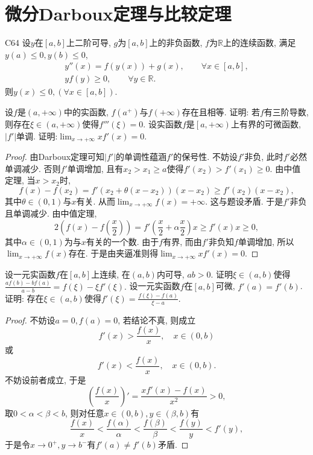 \section{微分Darboux定理与比较定理}
\begin{theorem}{}{C64}
设\(y\)在\([a,b]\)上二阶可导, \(g\)为\([a,b]\)上的非负函数, \(f\)为\(\mathbb{R}\)上的连续函数, 满足\(y(a)\leqslant 0,y(b)\leqslant 0\),\begin{gather*}
y''(x)=f(y(x))+g(x),\qquad\forall x\in[a,b],\\
yf(y)\geqslant 0,\qquad\forall y\in\mathbb{R}.
\end{gather*}则\(y(x)\leqslant 0,(\forall x\in[a,b])\).
\end{theorem}
\begin{quiza}
\woe 设\(f\)是\((a,+\infty)\)中的实函数, \(f(a^+)\)与\(f(+\infty)\)存在且相等. 证明: 若\(f\)有三阶导数, 则存在\(\xi\in(a,+\infty)\)使得\(f'''(\xi)=0\).
\woe 设实函数\(f\)是\(\left[a,+\infty\right)\)上有界的可微函数, \(|f'|\)单调. 证明:\(\lim_{x\rightarrow+\infty}xf'(x)=0.\)
\begin{proof}
由Darboux定理可知\(|f'|\)的单调性蕴涵\(f'\)的保号性. 不妨设\(f'\)非负, 此时\(f'\)必然单调减少. 否则\(f'\)单调增加, 且有\(x_2>x_1\geqslant a\)使得\(f'(x_2)>f'(x_1)\geqslant 0\). 由中值定理, 当\(x>x_2\)时,\[f(x)-f(x_2)=f'\left(x_2+\theta (x-x_2)\right)(x-x_2)\geqslant f'(x_2)(x-x_2),\]其中\(\theta\in(0,1)\)与\(x\)有关. 从而\(\lim_{x\rightarrow+\infty}f(x)=+\infty\). 这与题设矛盾. 于是\(f'\)非负且单调减少. 由中值定理,\[2\left(f(x)-f\left(\frac{x}{2}\right)\right)=f'\left(\frac{x}{2}+\alpha\frac{x}{2}\right)x\geqslant f'(x)x\geqslant 0,\]其中\(\alpha\in(0,1)\)为与\(x\)有关的一个数. 由于\(f\)有界, 而由\(f'\)非负知\(f\)单调增加, 所以\(\lim_{x\rightarrow+\infty}f(x)\)存在. 于是由夹逼准则得\(\lim_{x\rightarrow+\infty}xf'(x)=0.\)
\end{proof}
\woe 设一元实函数\(f\)在\([a,b]\)上连续, 在\((a,b)\)内可导, \(ab>0\). 证明\(\xi\in (a,b)\)使得\(\frac{af(b)-bf(a)}{a-b}=f(\xi)-\xi f'(\xi).\)
\woe 设一元实函数\(f\)在\([a,b]\)可微, \(f'(a)=f'(b)\). 证明: 存在\(\xi\in (a,b)\)使得\(f'(\xi)=\frac{f(\xi)-f(a)}{\xi-a}.\)
\begin{proof}
不妨设\(a=0,f(a)=0\), 若结论不真, 则成立\[f'(x)>\frac{f(x)}{x},\quad x\in (0,b)\]或\[f'(x)<\frac{f(x)}{x},\quad x\in (0,b).\]
不妨设前者成立, 于是\[\left(\frac{f(x)}{x}\right)'=\frac{xf'(x)-f(x)}{x^2}>0,\]取\(0<\alpha<\beta<b\), 则对任意\(x\in (0,b),y\in (\beta,b)\)有\[\frac{f(x)}{x}<\frac{f(\alpha)}{\alpha}<\frac{f(\beta)}{\beta}<\frac{f(y)}{y}<f'(y),\]于是令\(x\rightarrow 0^+,y\rightarrow b^-\)有\(f'(a)\ne f'(b)\)矛盾.

\end{proof}
\end{quiza}
